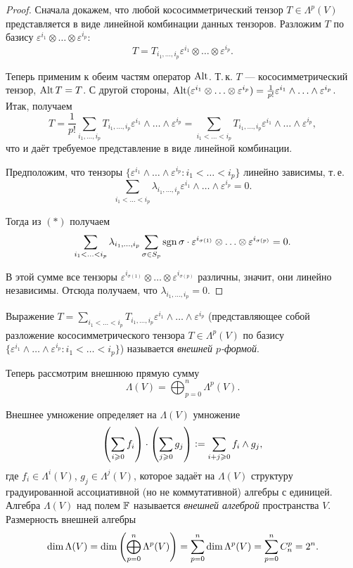 \begin{proof}
    Сначала докажем, что любой кососимметрический тензор $T \in \Lambda^p(V)$ представляется в виде линейной комбинации данных тензоров. Разложим $T$ по базису $\varepsilon^{i_1} \otimes \ldots \otimes \varepsilon^{i_p}$:
    \[
        T = T_{i_1, \ldots, i_p}\varepsilon^{i_1} \otimes \ldots \otimes \varepsilon^{i_p}.
    \]

    Теперь применим к обеим частям оператор $\operatorname{Alt}$. Т.\,к. $T$ --- кососимметрический тензор, $\operatorname{Alt} T = T$. С другой стороны, $\operatorname{Alt}(\varepsilon^{i_1} \otimes \ldots \otimes \varepsilon^{i_p}) = \frac{1}{p!}\varepsilon^{i_1} \wedge \ldots \wedge \varepsilon^{i_p}$. Итак, получаем
    \[
        T = \frac{1}{p!}\sum_{i_1, \ldots, i_p}T_{i_1, \ldots, i_p}\varepsilon^{i_1}\wedge \ldots \wedge \varepsilon^{i_p} = \sum_{i_1 < \ldots < i_p}T_{i_1, \ldots, i_p}\varepsilon^{i_1} \wedge \ldots \wedge \varepsilon^{i_p},
    \]
    что и даёт требуемое представление в виде линейной комбинации.

    Предположим, что тензоры $\{\varepsilon^{i_1} \wedge \ldots \wedge \varepsilon^{i_p} : i_1 < \ldots < i_p\}$ линейно зависимы, т.\,е.
    \[
        \sum_{i_1 < \ldots < i_p}\lambda_{i_1, \ldots, i_p}\varepsilon^{i_1} \wedge \ldots \wedge \varepsilon^{i_p} = 0.
    \]

    Тогда из $(\ast)$ получаем
    \[
        \sum_{i_1 < \ldots < i_p}\lambda_{i_1, \ldots, i_p}\sum_{\sigma \in S_p}\operatorname{sgn}\sigma \cdot \varepsilon^{i_{\sigma(1)}} \otimes \ldots \otimes \varepsilon^{i_{\sigma(p)}} = 0.
    \]

    В этой сумме все тензоры $\varepsilon^{i_{\sigma(1)}} \otimes \ldots \otimes \varepsilon^{i_{\sigma(p)}}$ различны, значит, они линейно независимы. Отсюда получаем, что $\lambda_{i_1, \ldots, i_p} = 0$.
\end{proof}

\begin{definition}
    Выражение $T = \sum\limits_{i_1 < \ldots < i_p}T_{i_1, \ldots, i_p}\varepsilon^{i_1} \wedge \ldots \wedge \varepsilon^{i_p}$ (представляющее собой разложение кососимметрического тензора $T \in \Lambda^p(V)$ по базису $\{\varepsilon^{i_1} \wedge \ldots \wedge \varepsilon^{i_p} : i_1 < \ldots < i_p\}$) называется \textit{внешней $p$-формой}.
\end{definition}

Теперь рассмотрим внешнюю прямую сумму
\[
    \Lambda(V) = \bigoplus_{p = 0}^n\Lambda^p(V).
\]

Внешнее умножение определяет на $\Lambda(V)$ умножение
\[
    \left(\sum_{i \geqslant 0}f_i\right) \cdot \left(\sum_{j \geqslant 0}g_j\right) \vcentcolon = \sum_{i + j \geqslant 0}f_i \wedge g_j,
\]
где $f_i \in \Lambda^i(V)$, $g_j \in \Lambda^j(V)$, которое задаёт на $\Lambda(V)$ структуру градуированной ассоциативной (но не коммутативной) алгебры с единицей. Алгебра $\Lambda(V)$ над полем $\mathbb{F}$ называется \textit{внешней алгеброй} пространства $V$. Размерность внешней алгебры
\[
    \dim\Lambda(V) = \dim\left(\bigoplus_{p = 0}^n\Lambda^p(V)\right) = \sum_{p = 0}^n\dim\Lambda^p(V) = \sum_{p = 0}^nC_n^p = 2^n.
\]

